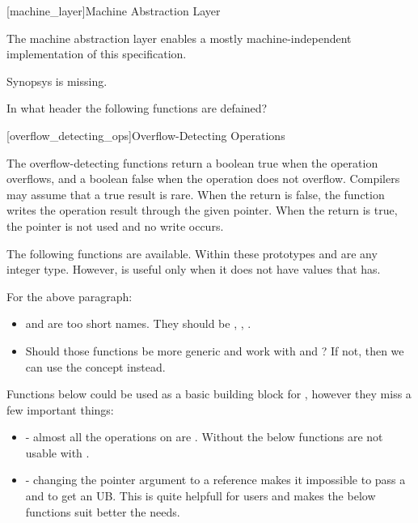 \begin{addedblock}
[machine_layer]{Machine Abstraction Layer}

The machine abstraction layer enables a mostly machine-independent implementation of this specification.

\begin{modifcommentblock}
Synopsys is missing.

In what header the following functions are defained?
\end{modifcommentblock}

[overflow_detecting_ops]{Overflow-Detecting Operations}

The overflow-detecting functions return a boolean true when the operation overflows, and a boolean false when the operation does not overflow. Compilers may assume that a true result is rare. When the return is false, the function writes the operation result through the given pointer. When the return is true, the pointer is not used and no write occurs.

The following functions are available. Within these prototypes  and  are any integer type. However,  is useful only when it does not have values that  has.

\begin{modifcommentblock}
For the above paragraph:
\begin{itemize}
  \item {} and  are too short names. They should be , , .
  \item Should those functions be more generic and work with  and ? If not, then we can use the concept  instead.
\end{itemize}
\end{modifcommentblock}

\begin{modifcommentblock}
Functions below could be used as a basic building block for , however they miss a few important things:
\begin{itemize}
  \item {} - almost all the operations on  are . Without  the below functions are not usable with .
  \item {} - changing the pointer argument to a reference makes it impossible to pass a  and to get an UB. This is quite helpfull for users and makes the below functions suit better the  needs.
\end{itemize}
\end{modifcommentblock}


\end{addedblock}
